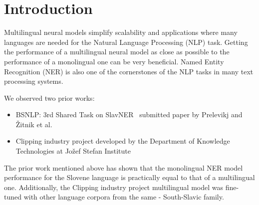 \documentclass[sigconf]{acmart}
\begin{document}


\maketitle

\section{Introduction}
\label{sec:introduction}
Multilingual neural models simplify scalability and applications where many languages are needed for the Natural Language Processing (NLP) task.
Getting the performance of a multilingual neural model as close as possible to the performance of a monolingual one can be very beneficial.
Named Entity Recognition (NER) is also one of the cornerstones of the NLP tasks in many text processing systems.

We observed two prior works:
\begin{itemize}
\item BSNLP: 3rd Shared Task on SlavNER~\cite{piskorski-etal-2021-slav} submitted paper by Prelevikj and Žitnik et al.~\cite{prelevikj-zitnik-2021-multilingual}
\item Clipping industry project developed by the Department of Knowledge Technologies at Jožef Stefan Institute~\cite{KTIJS}
\end{itemize}
The prior work mentioned above has shown that the monolingual NER model performance for the Slovene language is practically equal to that of a multilingual one.
Additionally, the Clipping industry project multilingual model was fine-tuned with other language corpora from the same - South-Slavic family.
\end{document}
